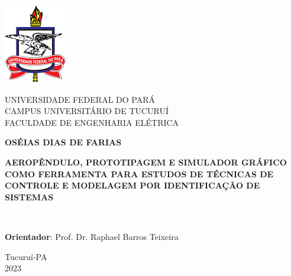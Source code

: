	\newpage
	\thispagestyle{empty}
		\newpage
		\setcounter{page}{2}
		\newpage
		\thispagestyle{empty}
		\begin{center}
  
            \includegraphics[scale=0.5]{Figuras/logoufpa.png}
            
			UNIVERSIDADE FEDERAL DO PARÁ\\
			CAMPUS UNIVERSITÁRIO DE TUCURUÍ\\
			FACULDADE DE ENGENHARIA ELÉTRICA
			
			\vspace{7mm}
			
			\vfill
			
			\textbf{OSÉIAS DIAS DE FARIAS}
			
			\vfill
			
			\vspace{10mm}
			
			\textbf{AEROPÊNDULO, PROTOTIPAGEM E SIMULADOR GRÁFICO COMO FERRAMENTA PARA ESTUDOS DE TÉCNICAS DE CONTROLE E MODELAGEM POR IDENTIFICAÇÃO DE SISTEMAS}
						
			\vfill\vfill
			
			\begin{flushright}				
				{\setlength{\fboxsep}{0pt}}
				
				\\
				\vspace{10pt}
				\begin{flushleft}
				\hspace{8.5cm}	{\footnotesize \textbf{Orientador}: Prof. Dr. Raphael Barros Teixeira} \\
				\end{flushleft}
			\end{flushright}
			\vfill\vfill
			Tucuruí-PA\\			
			2023
		\end{center}